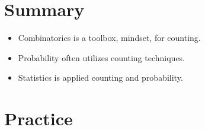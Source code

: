 \documentclass[main.tex]{subfiles}
\begin{document}
\section{Summary}

\begin{itemize}
	\item Combinatorics is a toolbox, mindset, for counting.
	\item Probability often utilizes counting techniques.
	\item Statistics is applied counting and probability.
\end{itemize}

\section{Practice}
\end{document}
